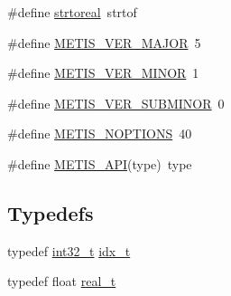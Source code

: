 \begin{DoxyCompactItemize}
\item 
\#define \hyperlink{a00876_a06c5f8b869d94ca0172612a9d102f6cf}{strtoreal}~strtof
\item 
\#define \hyperlink{a00876_a5b0167ec187274a9cf0a89bce6b36738}{M\+E\+T\+I\+S\+\_\+\+V\+E\+R\+\_\+\+M\+A\+J\+OR}~5
\item 
\#define \hyperlink{a00876_aa4bd7d2023e4c66c792060aae10307d9}{M\+E\+T\+I\+S\+\_\+\+V\+E\+R\+\_\+\+M\+I\+N\+OR}~1
\item 
\#define \hyperlink{a00876_a3ce4c253b26a346c2251594b15ad0f4b}{M\+E\+T\+I\+S\+\_\+\+V\+E\+R\+\_\+\+S\+U\+B\+M\+I\+N\+OR}~0
\item 
\#define \hyperlink{a00876_aa33cc5931473a308b9973ce911cfd16a}{M\+E\+T\+I\+S\+\_\+\+N\+O\+P\+T\+I\+O\+NS}~40
\item 
\#define \hyperlink{a00876_aa9e279790a754187de6212e08f098131}{M\+E\+T\+I\+S\+\_\+\+A\+PI}(type)~type
\end{DoxyCompactItemize}
\subsection*{Typedefs}
\begin{DoxyCompactItemize}
\item 
typedef \hyperlink{a00119_a37994e3b11c72957c6f454c6ec96d43d}{int32\+\_\+t} \hyperlink{a00876_aaa5262be3e700770163401acb0150f52}{idx\+\_\+t}
\item 
typedef float \hyperlink{a00876_a1924a4f6907cc3833213aba1f07fcbe9}{real\+\_\+t}
\end{DoxyCompactItemize}
